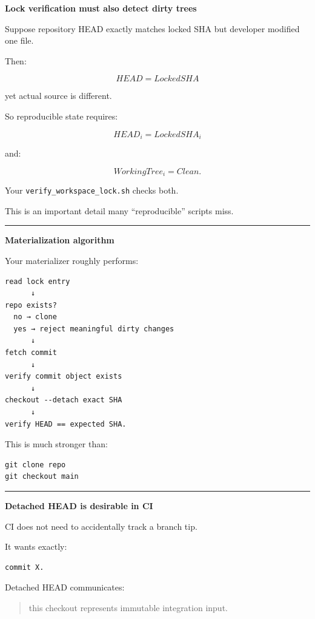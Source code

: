 \textbf{Lock verification must also detect dirty trees}

Suppose repository HEAD exactly matches locked SHA but developer modified one file.

Then:

\[
HEAD=LockedSHA
\]

yet actual source is different.

So reproducible state requires:

\[
HEAD_i=LockedSHA_i
\]

and:

\[
WorkingTree_i=Clean.
\]

Your \texttt{verify\_workspace\_lock.sh} checks both.

This is an important detail many ``reproducible'' scripts miss.

\begin{center}\rule{0.5\linewidth}{0.5pt}\end{center}

\textbf{Materialization algorithm}

Your materializer roughly performs:

\begin{verbatim}
read lock entry
      ↓
repo exists?
  no → clone
  yes → reject meaningful dirty changes
      ↓
fetch commit
      ↓
verify commit object exists
      ↓
checkout --detach exact SHA
      ↓
verify HEAD == expected SHA.
\end{verbatim}

This is much stronger than:

\begin{verbatim}
git clone repo
git checkout main
\end{verbatim}

\begin{center}\rule{0.5\linewidth}{0.5pt}\end{center}

\textbf{Detached HEAD is desirable in CI}

CI does not need to accidentally track a branch tip.

It wants exactly:

\begin{verbatim}
commit X.
\end{verbatim}

Detached HEAD communicates:

\begin{quote}
this checkout represents immutable integration input.
\end{quote}

